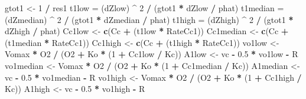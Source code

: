 \documentclass[
]{krantz}
\makeatletter
\newenvironment{Shaded}{\begin{snugshade}}{\end{snugshade}}
\newcommand{\DecValTok}[1]{\textcolor[rgb]{0.00,0.00,0.81}{#1}}
\newcommand{\FloatTok}[1]{\textcolor[rgb]{0.00,0.00,0.81}{#1}}
\newcommand{\KeywordTok}[1]{\textcolor[rgb]{0.13,0.29,0.53}{\textbf{#1}}}
\newcommand{\NormalTok}[1]{#1}
\newcommand{\OperatorTok}[1]{\textcolor[rgb]{0.81,0.36,0.00}{\textbf{#1}}}
\newcommand{\StringTok}[1]{\textcolor[rgb]{0.31,0.60,0.02}{#1}}
\newenvironment{kframe}{%
\medskip{}
\setlength{\fboxsep}{.8em}
 \def\at@end@of@kframe{}%
 \ifinner\ifhmode%
  \def\at@end@of@kframe{\end{minipage}}%
  \begin{minipage}{\columnwidth}%
 \fi\fi%
 \def\FrameCommand##1{\hskip\@totalleftmargin \hskip-\fboxsep
 \colorbox{shadecolor}{##1}\hskip-\fboxsep
     \hskip-\linewidth \hskip-\@totalleftmargin \hskip\columnwidth}%
 \MakeFramed {\advance\hsize-\width
   \@totalleftmargin\z@ \linewidth\hsize
   \@setminipage}}%
 {\par\unskip\endMakeFramed%
 \at@end@of@kframe}
\renewenvironment{Shaded}{\begin{kframe}}{\end{kframe}}
\makeatother
\begin{document}
\begin{Shaded}
\begin{Highlighting}[]
\NormalTok{gtot1 <-}\StringTok{ }\DecValTok{1} \OperatorTok{/}\StringTok{ }\NormalTok{res1}
\NormalTok{t1low =}\StringTok{ }\NormalTok{(dZlow) }\OperatorTok{^}\StringTok{ }\DecValTok{2} \OperatorTok{/}\StringTok{ }\NormalTok{(gtot1 }\OperatorTok{*}\StringTok{ }\NormalTok{dZlow }\OperatorTok{/}\StringTok{ }\NormalTok{phat)}
\NormalTok{t1median =}\StringTok{ }\NormalTok{(dZmedian) }\OperatorTok{^}\StringTok{ }\DecValTok{2} \OperatorTok{/}\StringTok{ }\NormalTok{(gtot1 }\OperatorTok{*}\StringTok{ }\NormalTok{dZmedian }\OperatorTok{/}\StringTok{ }\NormalTok{phat)}
\NormalTok{t1high =}\StringTok{ }\NormalTok{(dZhigh) }\OperatorTok{^}\StringTok{ }\DecValTok{2} \OperatorTok{/}\StringTok{ }\NormalTok{(gtot1 }\OperatorTok{*}\StringTok{ }\NormalTok{dZhigh }\OperatorTok{/}\StringTok{ }\NormalTok{phat)}
\NormalTok{Cc1low <-}\StringTok{ }\KeywordTok{c}\NormalTok{(Cc }\OperatorTok{+}\StringTok{ }\NormalTok{(t1low }\OperatorTok{*}\StringTok{ }\NormalTok{RateCc1))}
\NormalTok{Cc1median <-}\StringTok{ }\KeywordTok{c}\NormalTok{(Cc }\OperatorTok{+}\StringTok{ }\NormalTok{(t1median }\OperatorTok{*}\StringTok{ }\NormalTok{RateCc1))}
\NormalTok{Cc1high <-}\StringTok{ }\KeywordTok{c}\NormalTok{(Cc }\OperatorTok{+}\StringTok{ }\NormalTok{(t1high }\OperatorTok{*}\StringTok{ }\NormalTok{RateCc1))}
\NormalTok{vo1low <-}\StringTok{ }\NormalTok{Vomax }\OperatorTok{*}\StringTok{ }\NormalTok{O2 }\OperatorTok{/}\StringTok{ }\NormalTok{(O2 }\OperatorTok{+}\StringTok{ }\NormalTok{Ko }\OperatorTok{*}\StringTok{ }\NormalTok{(}\DecValTok{1} \OperatorTok{+}\StringTok{ }\NormalTok{Cc1low }\OperatorTok{/}\StringTok{ }\NormalTok{Kc)) }
\NormalTok{A1low <-}\StringTok{ }\NormalTok{vc }\OperatorTok{-}\StringTok{ }\FloatTok{0.5} \OperatorTok{*}\StringTok{ }\NormalTok{vo1low }\OperatorTok{-}\StringTok{ }\NormalTok{R }
\NormalTok{vo1median <-}\StringTok{ }\NormalTok{Vomax }\OperatorTok{*}\StringTok{ }\NormalTok{O2 }\OperatorTok{/}\StringTok{ }\NormalTok{(O2 }\OperatorTok{+}\StringTok{ }\NormalTok{Ko }\OperatorTok{*}\StringTok{ }\NormalTok{(}\DecValTok{1} \OperatorTok{+}\StringTok{ }\NormalTok{Cc1median }\OperatorTok{/}\StringTok{ }\NormalTok{Kc)) }
\NormalTok{A1median <-}\StringTok{ }\NormalTok{vc }\OperatorTok{-}\StringTok{ }\FloatTok{0.5} \OperatorTok{*}\StringTok{ }\NormalTok{vo1median }\OperatorTok{-}\StringTok{ }\NormalTok{R }
\NormalTok{vo1high <-}\StringTok{ }\NormalTok{Vomax }\OperatorTok{*}\StringTok{ }\NormalTok{O2 }\OperatorTok{/}\StringTok{ }\NormalTok{(O2 }\OperatorTok{+}\StringTok{ }\NormalTok{Ko }\OperatorTok{*}\StringTok{ }\NormalTok{(}\DecValTok{1} \OperatorTok{+}\StringTok{ }\NormalTok{Cc1high }\OperatorTok{/}\StringTok{ }\NormalTok{Kc)) }
\NormalTok{A1high <-}\StringTok{ }\NormalTok{vc }\OperatorTok{-}\StringTok{ }\FloatTok{0.5} \OperatorTok{*}\StringTok{ }\NormalTok{vo1high }\OperatorTok{-}\StringTok{ }\NormalTok{R }


\end{Highlighting}
\end{Shaded}
\end{document}
